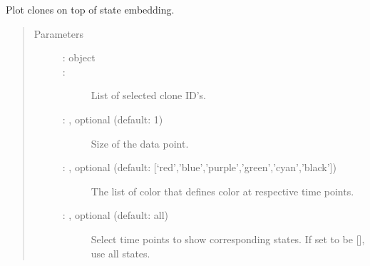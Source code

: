 \documentclass[letterpaper,10pt,english]{sphinxmanual}
\begin{document}
\begin{fulllineitems}
\label{\detokenize{cospar.pl.clones_on_manifold:cospar.pl.clones_on_manifold}}
Plot clones on top of state embedding.
\begin{quote}\begin{description}
\item[{Parameters}] \leavevmode\begin{description}
\item[{ :  object}] \leavevmode


\item[{ : }] \leavevmode
List of selected clone ID’s.

\item[{ : , optional (default: 1)}] \leavevmode
Size of the data point.

\item[{ : , optional (default: {[}‘red’,’blue’,’purple’,’green’,’cyan’,’black’{]})}] \leavevmode
The list of color that defines color at respective time points.

\item[{ : , optional (default: all)}] \leavevmode
Select time points to show corresponding states. If set to be {[}{]}, use all states.

\end{description}

\end{description}\end{quote}

\end{fulllineitems}
\end{document}
